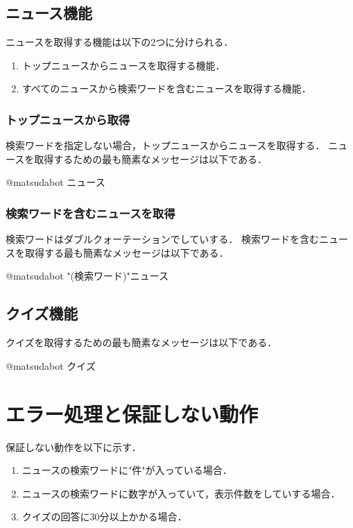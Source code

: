 \documentclass[12pt]{jsarticle}
\begin{document}
\subsection{ニュース機能}
ニュースを取得する機能は以下の2つに分けられる．
\begin{enumerate}
\item トップニュースからニュースを取得する機能．
\item すべてのニュースから検索ワードを含むニュースを取得する機能．
\end{enumerate}
\subsubsection{トップニュースから取得}
検索ワードを指定しない場合，トップニュースからニュースを取得する．
ニュースを取得するための最も簡素なメッセージは以下である．
\begin{center}
@matsudabot ニュース
\end{center}
\subsubsection{検索ワードを含むニュースを取得}
検索ワードはダブルクォーテーションでしていする．
検索ワードを含むニュースを取得する最も簡素なメッセージは以下である．
\begin{center}
	@matsudabot "(検索ワード)"ニュース
\end{center}
\subsection{クイズ機能}
クイズを取得するための最も簡素なメッセージは以下である．
\begin{center}
@matsudabot クイズ
\end{center}

\section{エラー処理と保証しない動作}
保証しない動作を以下に示す．
\begin{enumerate}
\item ニュースの検索ワードに"件"が入っている場合．\\
\item ニュースの検索ワードに数字が入っていて，表示件数をしていする場合．\\
\item クイズの回答に30分以上かかる場合．\\
\end{enumerate}



\end{document}

